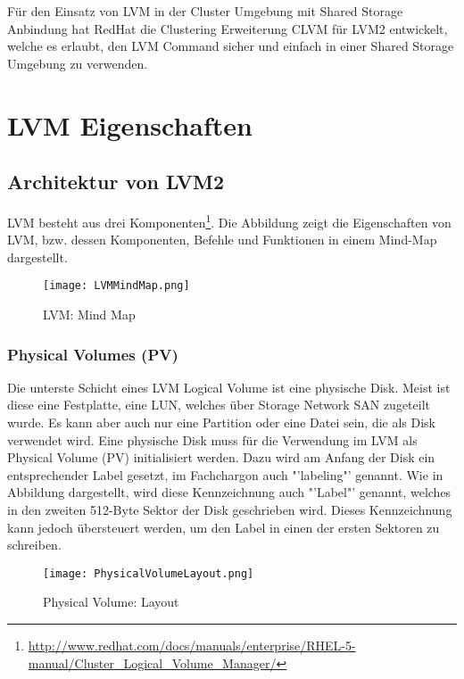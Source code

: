 Für den Einsatz von LVM in der \gls{Cluster} Umgebung mit Shared Storage Anbindung hat RedHat die Clustering Erweiterung CLVM für LVM2 entwickelt, welche es erlaubt, den LVM Command sicher und einfach in einer Shared Storage Umgebung zu verwenden.



\section{LVM Eigenschaften}


\subsection{Architektur von LVM2}
LVM besteht aus drei Komponenten\footnote{\href{http://www.redhat.com/docs/manuals/enterprise/RHEL-5-manual/Cluster_Logical_Volume_Manager/}{http://www.redhat.com/docs/manuals/enterprise/RHEL-5-manual/Cluster\_Logical\_Volume\_Manager/}}. Die Abbildung  zeigt die Eigenschaften von LVM, bzw. dessen Komponenten, Befehle und Funktionen in einem Mind-Map dargestellt.

\nocite{RedHatLVM}

\begin{figure}[H]
\centering
\texttt{[image: LVMMindMap.png]}
\caption{LVM: Mind Map}
\label{fig:LVMMindMap}
\end{figure}


\subsubsection{Physical Volumes (PV)}
Die unterste Schicht eines LVM Logical Volume ist eine physische Disk. Meist ist diese eine Festplatte, eine \gls{LUN}, welches über Storage Network \gls{SAN} zugeteilt wurde. Es kann aber auch nur eine Partition oder eine Datei sein, die als Disk verwendet wird. Eine physische Disk muss für die Verwendung im LVM als Physical Volume (PV) initialisiert werden. Dazu wird am Anfang der Disk ein entsprechender Label gesetzt, im Fachchargon auch "'labeling"' genannt.
Wie in Abbildung  dargestellt, wird diese Kennzeichnung auch "'Label"' genannt, welches in den zweiten 512-Byte Sektor der Disk geschrieben wird. Dieses Kennzeichnung kann jedoch übersteuert werden, um den Label in einen der ersten Sektoren zu schreiben.

\begin{figure}[htb]
\centering
\texttt{[image: PhysicalVolumeLayout.png]}
\caption{Physical Volume: Layout}
\label{fig:PhysicalVolumeLayout}
\end{figure}

